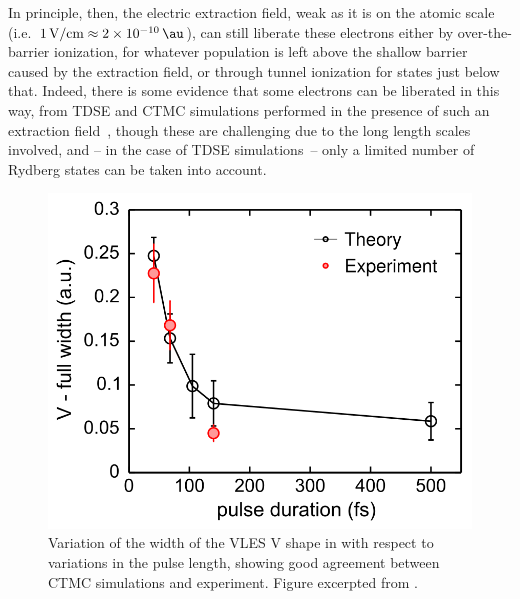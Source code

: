 In principle, then, the electric extraction field, weak as it is on the atomic scale (i.e.~$\SI{1}{\volt/\centi\meter}\approx \SI{2e-10}{\au}$), can still liberate these electrons either by over-the-barrier ionization, for whatever population is left above the shallow barrier caused by the extraction field, or through tunnel ionization for states just below that. Indeed, there is some evidence that some electrons can be liberated in this way, from TDSE and CTMC simulations performed in the presence of such an extraction field~\cite{ZES_paper, Rost_latest}, though these are challenging due to the long length scales involved, and -- in the case of TDSE simulations~-- only a limited number of Rydberg states can be taken into account.



\begin{figure}[!b]
  \centering
  \includegraphics[scale=1]{6-LES/Figures/figure6P.png}
  \caption[
  Variation of the width of the VLES V shape with respect to the pulse length, as observed and CTMC-simulated by B. Wolter et al.
  ]{
  Variation of the width of the VLES V shape in  with respect to variations in the pulse length, showing good agreement between CTMC simulations and experiment.
  Figure excerpted from .
  }
\label{f6-wolter-scaling-original-figure}
\end{figure}


